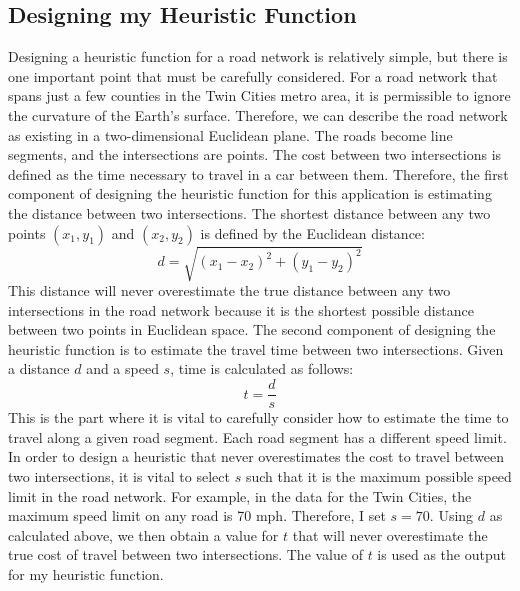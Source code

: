 \documentclass[conference]{IEEEtran}
\begin{document}
\subsection{Designing my Heuristic Function}
Designing a heuristic function for a road network is relatively simple, but there is one important point that must be carefully considered.
\newline
\newline
For a road network that spans just a few counties in the Twin Cities metro area, it is permissible to ignore the curvature of the Earth’s surface. Therefore, we can describe the road network as existing in a two-dimensional Euclidean plane. The roads become line segments, and the intersections are points.
\newline
\newline
The cost between two intersections is defined as the time necessary to travel in a car between them. Therefore, the first component of designing the heuristic function for this application is estimating the distance between two intersections. The shortest distance between any two points $(x_1, y_1)$ and $(x_2, y_2)$ is defined by the Euclidean distance: \[d = \sqrt{(x_1 - x_2)^2 + (y_1 - y_2) ^ 2}\]
This distance will never overestimate the true distance between any two intersections in the road network because it is the shortest possible distance between two points in Euclidean space.
\newline
\newline
The second component of designing the heuristic function is to estimate the travel time between two intersections. Given a distance $d$ and a speed $s$, time is calculated as follows: 
\[t = \frac{d}{s}\]
This is the part where it is vital to carefully consider how to estimate the time to travel along a given road segment. Each road segment has a different speed limit. In order to design a heuristic that never overestimates the cost to travel between two intersections, it is vital to select $s$ such that it is the maximum possible speed limit in the road network.
\newline
\newline
For example, in the data for the Twin Cities, the maximum speed limit on any road is 70 mph. Therefore, I set $s = 70$. Using $d$ as calculated above, we then obtain a value for $t$ that will never overestimate the true cost of travel between two intersections. The value of $t$ is used as the output for my heuristic function.
\newline
\newline
\end{document}
